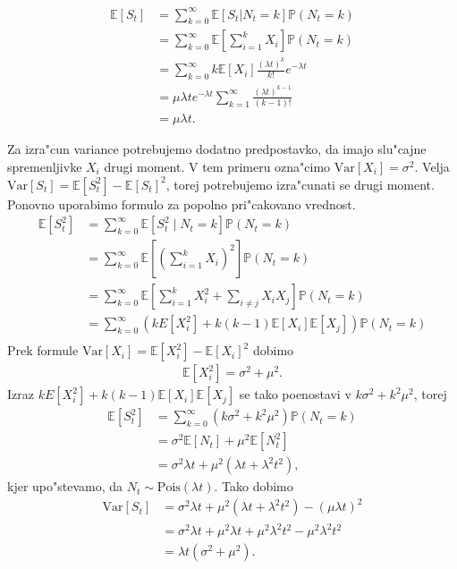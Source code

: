 \documentclass[12pt,a4paper]{amsart}
\theoremstyle{definition} %
\theoremstyle{plain} %
\newcommand{\E}{\mathbb{E}}
\newcommand{\Prob}{\mathbb{P}}
\newcommand{\1}{\mathds{1}}
\newcommand{\Pois}[1]{\text{Pois}(#1)}
\newcommand{\Var}[1]{\text{Var}\left[#1\right]}
\begin{document}
    \begin{align*}
        \E\left[S_t\right] &= \sum_{k=0}^{\infty} \E\left[S_t | N_t = k\right] \Prob\left(N_t = k\right)\\
                           &= \sum_{k=0}^{\infty} \E\left[\sum_{i=1}^{k} X_i\right] \Prob\left(N_t = k\right)\\
                           &= \sum_{k=0}^{\infty}k\E\left[X_i\right]\frac{(\lambda t)^k}{k!}e^{-\lambda t}\\
                           &= \mu\lambda te^{-\lambda t}\sum_{k=1}^{\infty}\frac{(\lambda t)^{k-1}}{(k-1)!}\\
                           &= \mu\lambda t.
    \end{align*}

    \noindent
    Za izra"cun variance potrebujemo dodatno predpostavko, da imajo slu"cajne spremenljivke $X_i$ 
    drugi moment. V tem primeru ozna"cimo $\Var{X_i} = \sigma^2$. Velja 
    $\Var{S_t} = \E\left[S_t^2\right] - \E\left[S_t\right]^2$, torej potrebujemo izra"cunati se 
    drugi moment. Ponovno uporabimo formulo za popolno pri"cakovano vrednost.
    \begin{align*}
        \E\left[S_t^2\right] 
                &= \sum_{k=0}^\infty\E\left[S_t^2\mid N_t = k\right]\Prob\left(N_t=k\right) \\
                &= \sum_{k=0}^\infty\E\left[\left(\sum_{i=1}^kX_i\right)^2\right]\Prob\left(N_t=k\right)\\
                &= \sum_{k=0}^\infty\E\left[\sum_{i=1}^kX_i^2 + \sum_{i\neq j}X_iX_j\right]\Prob\left(N_t=k\right)\\
                &= \sum_{k=0}^\infty\left(kE\left[X_i^2\right] 
                    +k(k-1)\E\left[X_i\right]\E\left[X_j\right]\right)\Prob\left(N_t=k\right)\\
    \end{align*}
    Prek formule $\Var{X_i} = \E\left[X_i^2\right] - \E\left[X_i\right]^2$ dobimo
    \begin{align*}
        \E\left[X_i^2\right] = \sigma^2 + \mu^2.
    \end{align*}
    Izraz $kE\left[X_i^2\right]+k(k-1)\E\left[X_i\right]\E\left[X_j\right]$ se tako poenostavi v 
    $k\sigma^2 + k^2\mu^2$, torej 
    \begin{align*}
        \E\left[S_t^2\right] 
                &= \sum_{k=0}^\infty\left(k\sigma^2 + k^2\mu^2\right)\Prob\left(N_t=k\right)\\
                &= \sigma^2\E\left[N_t\right] + \mu^2\E\left[N_t^2\right]\\
                &= \sigma^2\lambda t + \mu^2(\lambda t + \lambda^2t^2),
    \end{align*}
    kjer upo"stevamo, da $N_t \sim \Pois{\lambda t}$. Tako dobimo
    \begin{align*}
        \Var{S_t} 
                &= \sigma^2\lambda t + \mu^2(\lambda t + \lambda^2t^2) - (\mu\lambda t)^2 \\
                &= \sigma^2\lambda t + \mu^2\lambda t + \mu^2\lambda^2t^2 - \mu^2\lambda^2t^2\\
                &= \lambda t\left(\sigma^2 + \mu^2\right).
    \end{align*}
\end{document}
